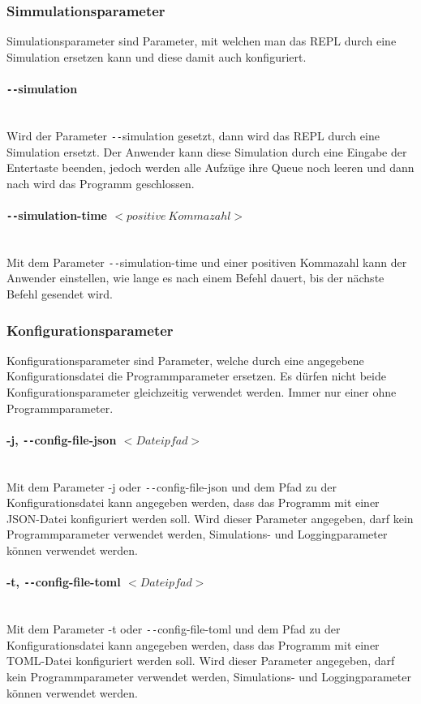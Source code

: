 \subsubsection{Simmulationsparameter}
Simulationsparameter sind Parameter, mit welchen man das REPL durch eine Simulation ersetzen kann und diese damit auch konfiguriert.

\paragraph{\texttt{-{}-}simulation}\mbox{} \\
Wird der Parameter \texttt{-{}-}simulation gesetzt, dann wird das REPL durch eine Simulation ersetzt. Der Anwender kann diese Simulation durch eine Eingabe der Entertaste beenden, jedoch werden alle Aufzüge ihre Queue noch leeren und dann nach wird das Programm geschlossen.

\paragraph{\texttt{-{}-}simulation-time $<positive \: Kommazahl>$}\mbox{} \\
Mit dem Parameter \texttt{-{}-}simulation-time und einer positiven Kommazahl kann der Anwender einstellen, wie lange es nach einem Befehl dauert, bis der nächste Befehl gesendet wird.

\subsubsection{Konfigurationsparameter}
Konfigurationsparameter sind Parameter, welche durch eine angegebene Konfigurationsdatei die Programmparameter ersetzen. Es dürfen nicht beide Konfigurationsparameter gleichzeitig verwendet werden. Immer nur einer ohne Programmparameter.

\paragraph{-j, \texttt{-{}-}config-file-json $<Dateipfad>$}\mbox{} \\
Mit dem Parameter -j oder \texttt{-{}-}config-file-json und dem Pfad zu der Konfigurationsdatei kann angegeben werden, dass das Programm mit einer JSON-Datei konfiguriert werden soll. Wird dieser Parameter angegeben, darf kein Programmparameter verwendet werden, Simulations- und Loggingparameter können verwendet werden.

\paragraph{-t, \texttt{-{}-}config-file-toml $<Dateipfad>$}\mbox{} \\
Mit dem Parameter -t oder \texttt{-{}-}config-file-toml und dem Pfad zu der Konfigurationsdatei kann angegeben werden, dass das Programm mit einer TOML-Datei konfiguriert werden soll. Wird dieser Parameter angegeben, darf kein Programmparameter verwendet werden, Simulations- und Loggingparameter können verwendet werden.


